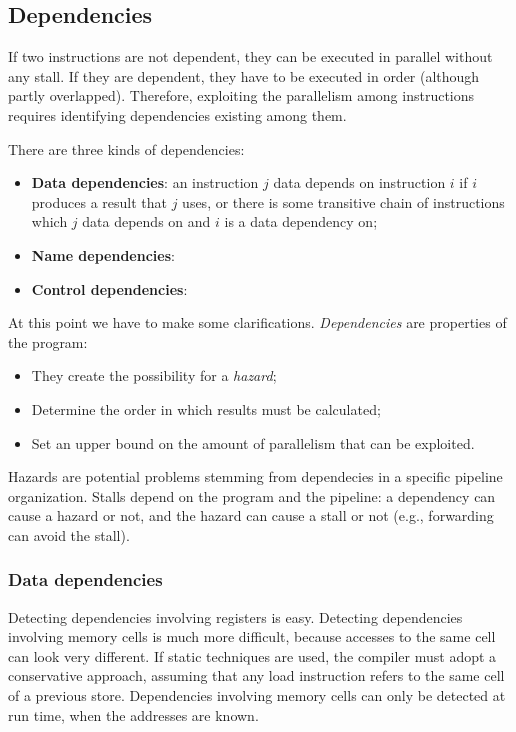 \documentclass[a4paper,11pt]{article}
\begin{document}
\subsection{Dependencies}

If two instructions are not dependent, they can be executed in parallel without any stall.
If they are dependent, they have to be executed in order (although partly overlapped).
Therefore, exploiting the parallelism among instructions requires identifying dependencies existing among them.

There are three kinds of dependencies:
\begin{itemize}
	\item \textbf{Data dependencies}: an instruction $j$ data depends on instruction $i$ if $i$ produces a result that $j$ uses, or there is some transitive chain of instructions which $j$ data depends on and $i$ is a data dependency on;
	\item \textbf{Name dependencies}:
	\item \textbf{Control dependencies}:
\end{itemize}

At this point we have to make some clarifications.
\textit{Dependencies} are properties of the program:
\begin{itemize}
	\item They create the possibility for a \textit{hazard};
	\item Determine the order in which results must be calculated;
	\item Set an upper bound on the amount of parallelism that can be exploited.
\end{itemize}
Hazards are potential problems stemming from
dependecies in a specific pipeline organization.
Stalls depend on the program and the pipeline: a
dependency can cause a hazard or not, and the hazard
can cause a stall or not (e.g., forwarding can avoid the
stall).

\subsubsection{Data dependencies}

Detecting dependencies involving registers is easy.
Detecting dependencies involving memory cells is much
more difficult, because accesses to the same cell can
look very different.
If static techniques are used, the compiler must adopt a
conservative approach, assuming that any load
instruction refers to the same cell of a previous store.
Dependencies involving memory cells can only be
detected at run time, when the addresses are known.
\end{document}
